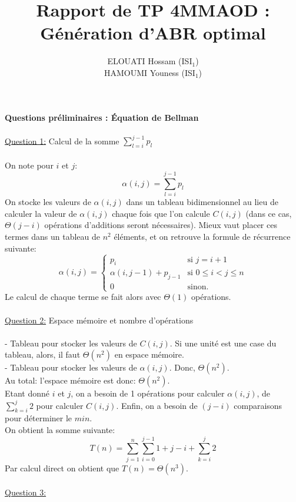 \documentclass[a4paper, 10pt, french]{article}
\title{Rapport de TP 4MMAOD : Génération d'ABR optimal}
\author{
ELOUATI Hossam (ISI$_1$)
\\ HAMOUMI Youness (ISI$_1$)
}
\begin{document}
\maketitle




\textbf{Questions préliminaires : Équation de Bellman} \\
\\
\underline{Question 1:} Calcul de la somme $\sum_{l=i}^{j-1}p_l$ \\
\\
On note pour $i$ et $j$:
$$
\alpha(i,j) = \sum_{l=i}^{j-1}p_l
$$
On stocke les valeurs de $\alpha(i,j)$ dans un tableau bidimensionnel
 au lieu de calculer la valeur de $\alpha(i,j)$ chaque fois que l'on calcule
 $C(i,j)$ (dans ce cas, $\Theta(j-i)$ opérations d'additions seront nécessaires).
 Mieux vaut placer ces termes dans un tableau de $n^2$ éléments, et on retrouve la
 formule de récurrence suivante:
 $$
 \alpha(i,j) = \left\{
     \begin{array}{ll}
         p_{i} & \mbox{si } j=i+1 \\
         \alpha(i,j-1) + p_{j-1} & \mbox{si } 0 \leq i < j \leq n \\
         0 & \mbox{sinon.}
     \end{array}
 \right.
 $$
 Le calcul de chaque terme se fait alors avec $\Theta(1)$ opérations.
\\
\\
\underline{Question 2:} Espace mémoire et nombre d'opérations \\
\\
- Tableau pour stocker les valeurs de $C(i,j)$. Si une unité est une case du tableau,
alors, il faut $\Theta(n^2)$ en espace mémoire. \\
- Tableau pour stocker les valeurs de $\alpha(i,j)$. Donc, $\Theta(n^2)$. \\
Au total: l'espace mémoire est donc: $\Theta(n^2)$.
\\
Etant donné $i$ et $j$, on a besoin de 1 opérations pour calculer
$\alpha(i,j)$, de $\sum_{k=i}^{j}2$ pour calculer $C(i,j)$. Enfin, on a
besoin de $(j-i)$ comparaisons pour déterminer le $min$. \\
On obtient la somme suivante:
$$
T(n) = \sum_{j=1}^{n}\sum_{i=0}^{j-1}1+j-i+\sum_{k=i}^{j}2
$$
Par calcul direct on obtient que $T(n) = \Theta(n^3)$.
\\
\\
\underline{Question 3:} \\
\end{document}
